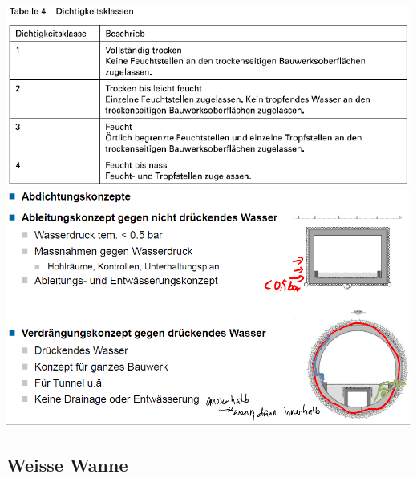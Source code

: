 \begin{multicols}{2}
			
			\includegraphics[width=\linewidth]{images/Dichtheit3Klassen.PNG}	
			\includegraphics[width=\linewidth]{images/Dichtheit3Abdichtungskonzept.PNG}
			
			
			\subsection{Weisse Wanne}
				

\end{multicols}
